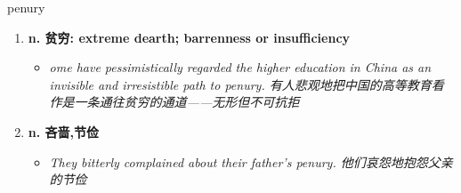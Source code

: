 
\begin{frame}
{\huge penury}
\begin{center}
\begin{enumerate}\Large
  \item \textbf{n. 贫穷: extreme dearth; barrenness or insufficiency}
  \begin{itemize}
    \item \em{\Large{ome have pessimistically regarded the higher education in China as an invisible and irresistible path to penury. 有人悲观地把中国的高等教育看作是一条通往贫穷的通道——无形但不可抗拒}}
  \end{itemize}
  \item \textbf{n. 吝啬,节俭}
  \begin{itemize}
    \item \em{\Large{They bitterly complained about their father's penury. 他们哀怨地抱怨父亲的节俭}}
  \end{itemize}
\end{enumerate}
\end{center}
\end{frame}
